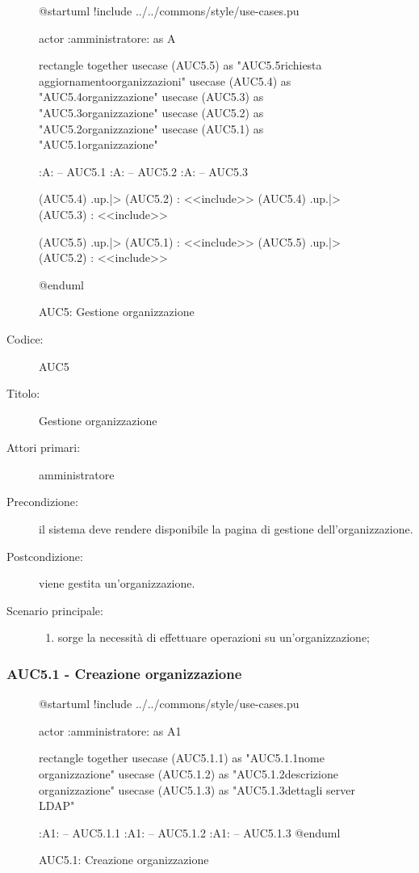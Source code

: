 \documentclass[../../../analisi-dei-requisiti.tex]{subfiles}
\begin{document}
\begin{figure}[h!]
  \centering
  \begin{plantuml}
  @startuml
  !include ../../commons/style/use-cases.pu

  actor :amministratore: as A

  rectangle {
    together {
      usecase (AUC5.5) as "AUC5.5\nInvio richiesta aggiornamento\nlista organizzazioni"
      usecase (AUC5.4) as "AUC5.4\nSeleziona organizzazione"
      usecase (AUC5.3) as "AUC5.3\nModifica organizzazione"
      usecase (AUC5.2) as "AUC5.2\nEliminazione organizzazione"
      usecase (AUC5.1) as "AUC5.1\nCreazione organizzazione"
    }
  }

  :A: -- AUC5.1
  :A: -- AUC5.2
  :A: -- AUC5.3

  (AUC5.4) .up.|> (AUC5.2) : <<include>>
  (AUC5.4) .up.|> (AUC5.3) : <<include>>

  (AUC5.5) .up.|> (AUC5.1) : <<include>>
  (AUC5.5) .up.|> (AUC5.2) : <<include>>

  @enduml
  \end{plantuml}
  \caption{AUC5: Gestione organizzazione}
  \label{fig:AUC5}
\end{figure}

\begin{description}
  \item[Codice:] AUC5
  \item[Titolo:] Gestione organizzazione
  \item[Attori primari:] amministratore
  \item[Precondizione:] il sistema deve rendere disponibile la pagina di gestione dell'organizzazione.
  \item[Postcondizione:] viene gestita un'organizzazione.
  \item[Scenario principale:]
  \begin{enumerate}
    \item sorge la necessità di effettuare operazioni su un'organizzazione;
  \end{enumerate}
\end{description}

\subsubsection{AUC5.1 - Creazione organizzazione}%
  \label{subs:AUC5.1}

  \begin{figure}[h!]
    \centering
    \begin{plantuml}
    @startuml
    !include ../../commons/style/use-cases.pu

    actor :amministratore: as A1

    rectangle {
      together {
        usecase (AUC5.1.1) as "AUC5.1.1\nInserisci nome organizzazione"
        usecase (AUC5.1.2) as "AUC5.1.2\nInserisci descrizione organizzazione"
        usecase (AUC5.1.3) as "AUC5.1.3\nConfigurazione dettagli server LDAP"
      }
    }

    :A1: -- AUC5.1.1
    :A1: -- AUC5.1.2
    :A1: -- AUC5.1.3
    @enduml
    \end{plantuml}
    \caption{AUC5.1: Creazione organizzazione}
    \label{fig:AUC5_1}
  \end{figure}
\end{document}
